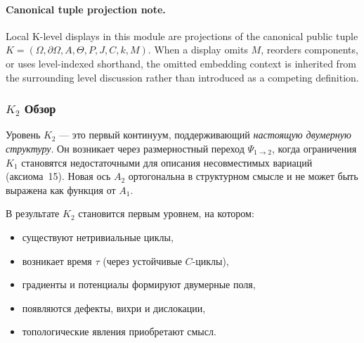 



\paragraph{Canonical tuple projection note.}
Local K-level displays in this module are projections of the canonical public tuple \(K=(\Omega,\partial\Omega,A,\Theta,P,J,C,k,M)\). When a display omits \(M\), reorders components, or uses level-indexed shorthand, the omitted embedding context is inherited from the surrounding level discussion rather than introduced as a competing definition.

\subsubsection{\texorpdfstring{$K_2$}{K_2} Обзор}
\label{sec:k2-overview}

Уровень $K_2$ — это первый континуум, поддерживающий
\emph{настоящую двумерную структуру}. Он возникает через
размерностный переход
$\Psi_{1\to2}$, когда ограничения $K_1$ становятся недостаточными для
описания несовместимых вариаций (аксиома~15). Новая ось $A_2$ ортогональна
в структурном смысле и не может быть выражена как функция от $A_1$.

В результате $K_2$ становится первым уровнем, на котором:
\begin{itemize}
    \item существуют нетривиальные циклы,
    \item возникает время $\tau$ (через устойчивые $C$-циклы),
    \item градиенты и потенциалы формируют двумерные поля,
    \item появляются дефекты, вихри и дислокации,
    \item топологические явления приобретают смысл.
\end{itemize}

